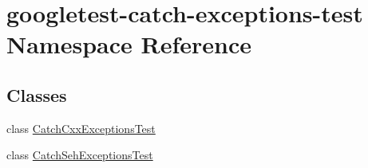 \hypertarget{namespacegoogletest-catch-exceptions-test}{}\section{googletest-\/catch-\/exceptions-\/test Namespace Reference}
\label{namespacegoogletest-catch-exceptions-test}
\subsection*{Classes}
\begin{DoxyCompactItemize}
\item 
class \mbox{\hyperlink{classgoogletest-catch-exceptions-test_1_1CatchCxxExceptionsTest}{Catch\+Cxx\+Exceptions\+Test}}
\item 
class \mbox{\hyperlink{classgoogletest-catch-exceptions-test_1_1CatchSehExceptionsTest}{Catch\+Seh\+Exceptions\+Test}}
\end{DoxyCompactItemize}
